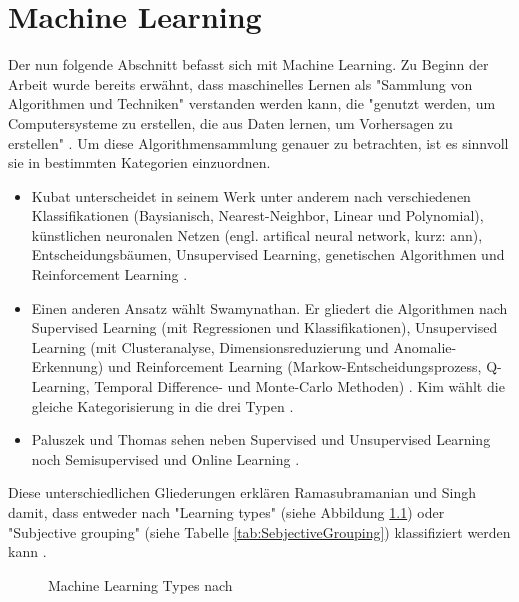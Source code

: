 \chapter{Machine Learning}\label{sec:MachineLearning}
Der nun folgende Abschnitt befasst sich mit Machine Learning. Zu Beginn der Arbeit wurde bereits erwähnt, dass maschinelles Lernen als "Sammlung von Algorithmen und Techniken" verstanden werden kann, die "genutzt werden, um Computersysteme zu erstellen, die aus Daten lernen, um Vorhersagen zu erstellen" \citep[S.~53; eigene Übersetzung]{swamynathan_mastering_2017}. Um diese Algorithmensammlung genauer zu betrachten, ist es sinnvoll sie in bestimmten Kategorien einzuordnen. 
\begin{itemize}
\item Kubat unterscheidet in seinem Werk unter anderem nach verschiedenen Klassifikationen (Baysianisch, Nearest-Neighbor, Linear und Polynomial), künstlichen neuronalen Netzen (engl. artifical neural network, kurz: \gls{ann}), Entscheidungsbäumen, Unsupervised Learning, genetischen Algorithmen und Reinforcement Learning  \citep{kubat_introduction_2017}.
\item Einen anderen Ansatz wählt Swamynathan. Er gliedert die Algorithmen nach Supervised Learning (mit Regressionen und Klassifikationen), Unsupervised Learning (mit Clusteranalyse, Dimensionsreduzierung und Anomalie-Erkennung) und Reinforcement Learning (Markow-Entscheidungsprozess, Q-Learning, Temporal Difference- und Monte-Carlo Methoden) \citep{swamynathan_mastering_2017}. Kim wählt die gleiche Kategorisierung in die drei Typen \citep{kim_matlab_2017}.
\item Paluszek und Thomas sehen neben Supervised und Unsupervised Learning noch Semisupervised und Online Learning \citep{paluszek_matlab_2017}.
\end{itemize}
Diese unterschiedlichen Gliederungen erklären Ramasubramanian und Singh damit, dass entweder nach "Learning types" (siehe Abbildung \ref{fig:MachineLearningTypes_all}) oder "Subjective grouping" (siehe Tabelle \ref{tab:SebjectiveGrouping}) klassifiziert werden kann \citep[S.~222]{ramasubramanian_machine_2017}.
\begin{figure}[H]
\centering
{}
\caption{Machine Learning Types nach \citep[S.~222]{ramasubramanian_machine_2017}}
\label{fig:MachineLearningTypes_all}
\end{figure}

